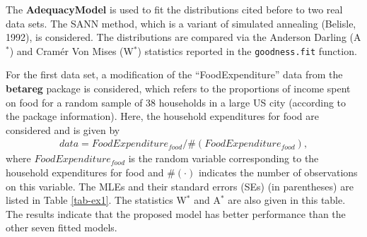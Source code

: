 \documentclass[twoside,leqno,11pt]{article}
\begin{document}
The {\bf AdequacyModel} is used to fit the distributions cited before to two real data sets. The SANN method, which is a
variant of simulated annealing (Belisle, 1992), is considered. The distributions are compared via the Anderson
Darling (A$^{*}$) and Cram\'er Von Mises (W$^{*}$) statistics reported in the {\tt goodness.fit} function.

For the first data set, a modification of the ``FoodExpenditure'' data from the {\bf betareg} package  is considered, which refers
to the proportions of income spent on food for a random sample of 38 households in a large US city (according to the package information).
Here, the household expenditures for food are considered and is given by
\begin{eqnarray*}
data = FoodExpenditure_{food} / \#(FoodExpenditure_{food}),
\end{eqnarray*}
where $FoodExpenditure_{food}$ is the random variable corresponding to the household expenditures for food and $\#(\cdot)$ indicates the number of
observations on this variable. The MLEs and their standard errors (SEs) (in parentheses) are listed in Table \ref{tab-ex1}.
The statistics  W$^{*}$ and A$^{*}$ are also given in this table. The results indicate that the proposed model has better performance than the other
seven fitted models.
\end{document}
